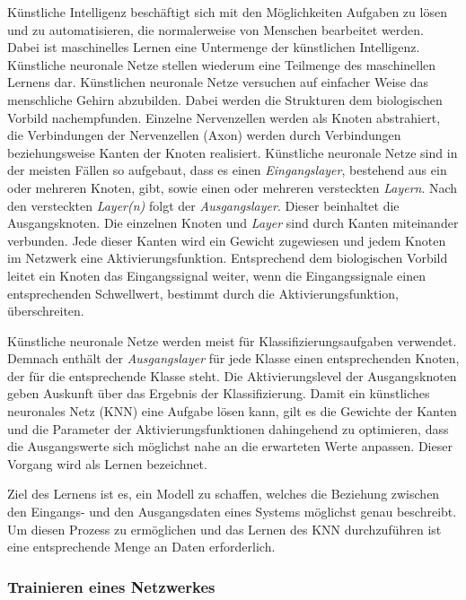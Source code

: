 \documentclass[11pt]{article}
\begin{document}
Künstliche Intelligenz beschäftigt sich mit den Möglichkeiten Aufgaben zu lösen und zu automatisieren, die normalerweise von Menschen bearbeitet werden. Dabei ist maschinelles Lernen eine Untermenge der künstlichen Intelligenz. Künstliche neuronale Netze stellen wiederum eine Teilmenge des maschinellen Lernens dar. Künstlichen neuronale Netze versuchen auf einfacher Weise das menschliche Gehirn abzubilden. Dabei werden die Strukturen dem biologischen Vorbild nachempfunden. Einzelne Nervenzellen werden als Knoten abstrahiert, die Verbindungen der Nervenzellen (Axon) werden durch Verbindungen beziehungsweise Kanten der Knoten realisiert. Künstliche neuronale Netze sind in der meisten Fällen so aufgebaut, dass es einen \textit{Eingangslayer}, bestehend aus ein oder mehreren Knoten, gibt, sowie einen oder mehreren versteckten \textit{Layern}. Nach den versteckten \textit{Layer(n)} folgt der \textit{Ausgangslayer}. Dieser beinhaltet die Ausgangsknoten. Die einzelnen Knoten und \textit{Layer} sind durch Kanten miteinander verbunden. Jede dieser Kanten wird ein Gewicht zugewiesen und jedem Knoten im Netzwerk eine Aktivierungsfunktion. Entsprechend dem biologischen Vorbild leitet ein Knoten das Eingangssignal weiter, wenn die Eingangssignale einen entsprechenden Schwellwert, bestimmt durch die Aktivierungsfunktion, überschreiten.

Künstliche neuronale Netze werden meist für Klassifizierungsaufgaben verwendet. Demnach enthält der \textit{Ausgangslayer} für jede Klasse einen entsprechenden Knoten, der für die entsprechende Klasse steht. Die Aktivierungslevel der Ausgangsknoten geben Auskunft über das Ergebnis der Klassifizierung.  Damit ein künstliches neuronales Netz (KNN) eine Aufgabe lösen kann, gilt es die Gewichte der Kanten und die Parameter der Aktivierungsfunktionen dahingehend zu optimieren, dass die Ausgangswerte sich möglichst nahe an die erwarteten Werte anpassen. Dieser Vorgang wird als Lernen bezeichnet.

Ziel des Lernens ist es, ein Modell zu schaffen, welches die Beziehung zwischen den Eingangs- und den Ausgangsdaten eines Systems möglichst genau beschreibt. Um diesen Prozess zu ermöglichen und das Lernen des KNN durchzuführen ist eine entsprechende Menge an Daten erforderlich.\parencite{M.AnderssonM.Arvola}\parencite{Chollet2017}

\subsubsection{Trainieren eines Netzwerkes}
\end{document}
